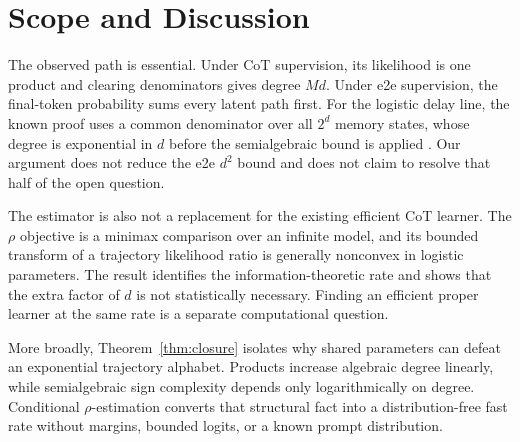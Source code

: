 \documentclass[twoside]{article}
\begin{document}
\section{Scope and Discussion}

The observed path is essential. Under CoT supervision, its likelihood is one product and clearing denominators gives degree $Md$. Under e2e supervision, the final-token probability sums every latent path first. For the logistic delay line, the known proof uses a common denominator over all $2^d$ memory states, whose degree is exponential in $d$ before the semialgebraic bound is applied \citep{doron2026stochastic}. Our argument does not reduce the e2e $d^2$ bound and does not claim to resolve that half of the open question.

The estimator is also not a replacement for the existing efficient CoT learner. The $\rho$ objective is a minimax comparison over an infinite model, and its bounded transform of a trajectory likelihood ratio is generally nonconvex in logistic parameters. The result identifies the information-theoretic rate and shows that the extra factor of $d$ is not statistically necessary. Finding an efficient proper learner at the same rate is a separate computational question.

More broadly, Theorem~\ref{thm:closure} isolates why shared parameters can defeat an exponential trajectory alphabet. Products increase algebraic degree linearly, while semialgebraic sign complexity depends only logarithmically on degree. Conditional $\rho$-estimation converts that structural fact into a distribution-free fast rate without margins, bounded logits, or a known prompt distribution.

\balance


\clearpage
\end{document}
